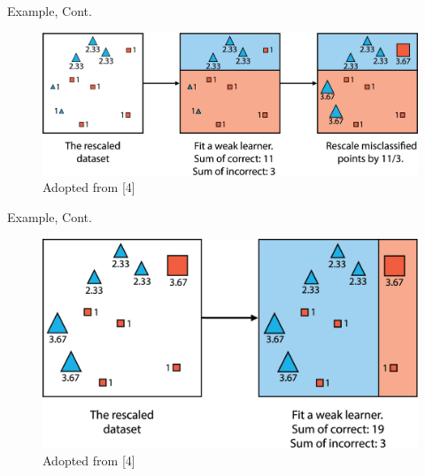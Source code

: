 \documentclass[serif, aspectratio=169]{beamer}
\begin{document}
\begin{frame}{Example, Cont.}
    \begin{center}
        \begin{figure}
            \includegraphics[width=\linewidth]{pic/adaboost_e2.png}
            {\scriptsize Adopted from [4]}
        \end{figure}
        \endminipage
    \end{center}
\end{frame}

\begin{frame}{Example, Cont.}
    \begin{center}
        \begin{figure}
            \includegraphics[width=\linewidth]{pic/adaboost_e3.png}
            {\scriptsize Adopted from [4]}
        \end{figure}
        \endminipage
    \end{center}
\end{frame}
\end{document}
